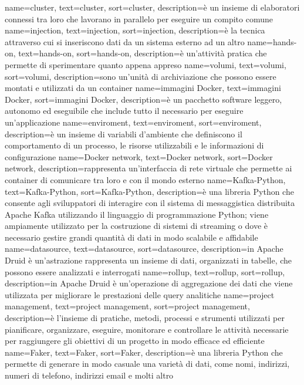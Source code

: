 {
    name={cluster},
    text=cluster,
    sort=cluster,
    description={è un insieme di elaboratori connessi tra loro che lavorano in parallelo per eseguire un compito comune}
}
{
    name={injection},
    text=injection,
    sort=injection,
    description={è la tecnica attraverso cui si inseriscono dati da un sistema esterno ad un altro}
}
{
    name={hands-on},
    text=hands-on,
    sort=hands-on,
    description={è un'attività pratica che permette di sperimentare quanto appena appreso}
}
{
    name={volumi},
    text=volumi,
    sort=volumi,
    description={sono un'unità di archiviazione che possono essere montati e utilizzati da un container}
}
{
    name={immagini Docker},
    text=immagini Docker,
    sort=immagini Docker,
    description={è un pacchetto software leggero, autonomo ed eseguibile che include tutto il necessario per eseguire un'applicazione}
}
{
    name={enviroment},
    text=enviroment,
    sort=enviroment,
    description={è un insieme di variabili d'ambiente che definiscono il comportamento di un processo, le risorse utilizzabili e le informazioni di configurazione}
}
{
    name={Docker network},
    text=Docker network,
    sort=Docker network,
    description={rappresenta un'interfaccia di rete virtuale che permette ai container di comunicare tra loro e con il mondo esterno}
}
{
    name={Kafka-Python},
    text=Kafka-Python,
    sort=Kafka-Python,
    description={è una libreria Python che consente agli sviluppatori di interagire con il sistema di messaggistica distribuita Apache Kafka utilizzando il linguaggio di programmazione Python; viene ampiamente utilizzato per la costruzione di sistemi di streaming o dove è necessario gestire grandi quantità di dati in modo scalabile e affidabile}
}
{
    name={datasource},
    text=datasource,
    sort=datasource,
    description={in Apache Druid è un'astrazione rappresenta un insieme di dati, organizzati in tabelle, che possono essere analizzati e interrogati}
}
{
    name={rollup},
    text=rollup,
    sort=rollup,
    description={in Apache Druid è un'operazione di aggregazione dei dati che viene utilizzata per migliorare le prestazioni delle query analitiche}
}
{
    name={project management},
    text=project management,
    sort=project management,
    description={è l'insieme di pratiche, metodi, processi e strumenti utilizzati per pianificare, organizzare, eseguire, monitorare e controllare le attività necessarie per raggiungere gli obiettivi di un progetto in modo efficace ed efficiente}
}
{
    name={Faker},
    text=Faker,
    sort=Faker,
    description={è una libreria Python che permette di generare in modo casuale una varietà di dati, come nomi, indirizzi, numeri di telefono, indirizzi email e molti altro}
}